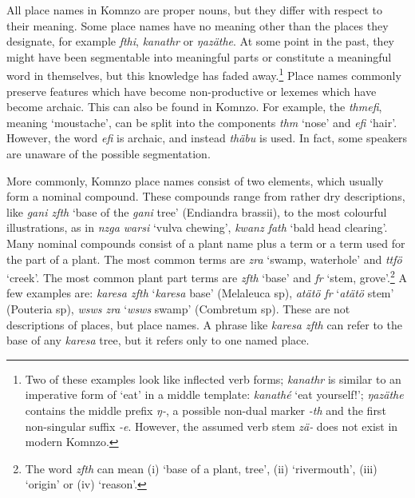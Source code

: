 All place names in Komnzo are proper nouns, but they differ with respect to their meaning. Some place names have no meaning other than the places they designate, for example \emph{fthi}, \emph{kanathr} or \emph{ŋazäthe}. At some point in the past, they might have been segmentable into meaningful parts or constitute a meaningful word in themselves, but this knowledge has faded away.\footnote{Two of these examples look like inflected verb forms; \emph{kanathr} is similar to an imperative form of `eat' in a middle template: \emph{kanathé} `eat yourself!'; \emph{ŋazäthe} contains the middle prefix \emph{ŋ-}, a possible non-dual marker \emph{-th} and the first non-singular suffix \emph{-e}. However, the assumed verb stem \emph{zä-} does not exist in modern Komnzo.} Place names commonly preserve features which have become non-productive or lexemes which have become archaic. This can also be found in Komnzo. For example, the  \emph{thmefi}, meaning `moustache', can be split into the components \emph{thm} `nose' and \emph{efi} `hair'. However, the word \emph{efi} is archaic, and instead \emph{thäbu} is used. In fact, some speakers are unaware of the possible segmentation.

More commonly, Komnzo place names consist of two elements, which usually form a nominal compound. These compounds range from rather dry descriptions, like \emph{gani zfth} `base of the \emph{gani} tree' (Endiandra brassii), to the most colourful illustrations, as in \emph{nzga warsi} `vulva chewing', \emph{kwanz fath} `bald head clearing'. Many nominal compounds consist of a plant name plus a  term or a term used for the part of a plant. The most common  terms are \emph{zra} `swamp, waterhole' and \emph{ttfö} `creek'. The most common plant part terms are \emph{zfth} `base' and \emph{fr} `stem, grove'.\footnote{The word \emph{zfth} can mean (i) `base of a plant, tree', (ii) `rivermouth', (iii) `origin' or (iv) `reason'.} A few examples are: \emph{karesa zfth} `\emph{karesa} base' (Melaleuca sp), \emph{atätö fr} `\emph{atätö} stem' (Pouteria sp), \emph{wsws zra} `\emph{wsws} swamp' (Combretum sp). These are not descriptions of places, but place names. A phrase like \emph{karesa zfth} can refer to the base of any \emph{karesa} tree, but it refers only to one named place.

